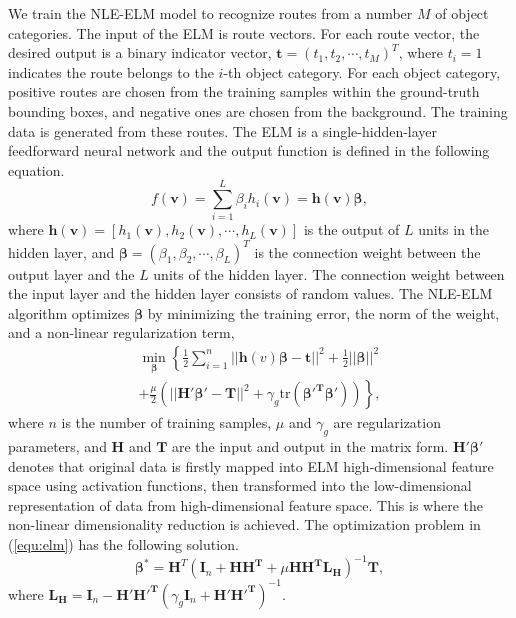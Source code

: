 \documentclass[journal]{IEEEtran}
\begin{document}
We train the NLE-ELM model to recognize routes from a number $M$ of object categories.
The input of the ELM is route vectors.
For each route vector, the desired output is a binary indicator vector, $\boldsymbol{t}=(t_1,t_2,\cdots,t_M)^T$,
where $t_i=1$ indicates the route belongs to the $i$-th object category.  
For each object category, positive routes are chosen from the training samples within the ground-truth bounding boxes,
and negative ones are chosen from the background.
The training data is generated from these routes.
The ELM is a single-hidden-layer feedforward neural network and the output function is defined in the following equation\cite{miche2010,huang2006}.
\begin{equation}
f(\boldsymbol{v})=\sum_{i=1}^L \beta_i h_i(\boldsymbol{v})=\boldsymbol{h}(\boldsymbol{v})\boldsymbol{\beta},
\end{equation}
where $\boldsymbol{h}(\boldsymbol{v})=\left[h_1(\boldsymbol{v}),h_2(\boldsymbol{v}),\cdots,h_L(\boldsymbol{v})\right]$
is the output of $L$ units in the hidden layer,
and $\boldsymbol\beta=(\beta_1,\beta_2,\cdots,\beta_L)^T$ is the connection weight between the output layer and the $L$ units of the hidden layer.
The connection weight between the input layer and the hidden layer consists of random values.
The NLE-ELM algorithm optimizes $\boldsymbol\beta$ by minimizing the training error, the norm of the weight, and a non-linear regularization term,
\begin{equation}
\label{equ:elm}
\begin{split}
\min_{\boldsymbol\beta}\left\{\frac{1}{2}\sum_{i=1}^n||\boldsymbol{h}(v)\boldsymbol\beta-\boldsymbol{t}||^2+\frac{1}{2}||\boldsymbol\beta||^2\right.\\
\left.+\frac{\mu}{2}\left(||\boldsymbol{H'\beta'-T}||^2+\gamma_g\mathrm{tr}(\boldsymbol{\beta'^T\beta'})\right)\right\},
\end{split}
\end{equation}
where $n$ is the number of training samples, 
$\mu$ and $\gamma_g$ are regularization parameters,
and $\boldsymbol{H}$ and $\boldsymbol{T}$ are the input and output in the matrix form.
$\boldsymbol{H'\beta'}$ denotes that original data is firstly mapped into ELM high-dimensional feature space using activation functions, 
then transformed into the low-dimensional representation of data from high-dimensional feature space.
This is where the non-linear dimensionality reduction is achieved.
The optimization problem in (\ref{equ:elm}) has the following solution.
\begin{equation}
\boldsymbol\beta^{*}=\boldsymbol{H}^T\left(\boldsymbol{I}_n+\boldsymbol{HH^T}+\mu\boldsymbol{HH^T L_H}\right)^{-1}\boldsymbol{T},
\end{equation}
where $\boldsymbol{L_H}=\boldsymbol{I}_n-\boldsymbol{H'H'^T}(\gamma_g\boldsymbol{I}_n+\boldsymbol{H'H'^T})^{-1}$.
\end{document}

